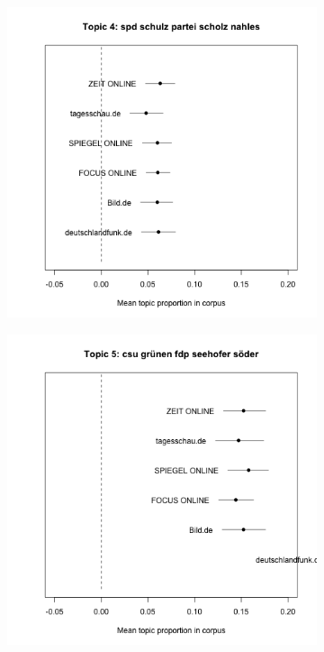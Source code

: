 \documentclass[12pt,a4paper,notitlepage]{article}
\begin{document}
\begin{figure}[H]
\begin{center}
\begin{subfigure}[normla]{0.2\textwidth}
		\end{subfigure}
				\begin{subfigure}[normla]{0.2\textwidth}
			\includegraphics[width=\textwidth]{../figs/estimate_effect4.png}
		\end{subfigure}
				\begin{subfigure}[normla]{0.2\textwidth}
			\includegraphics[width=\textwidth]{../figs/estimate_effect5.png}

\end{subfigure}
\end{center}
\end{figure}
\end{document}
